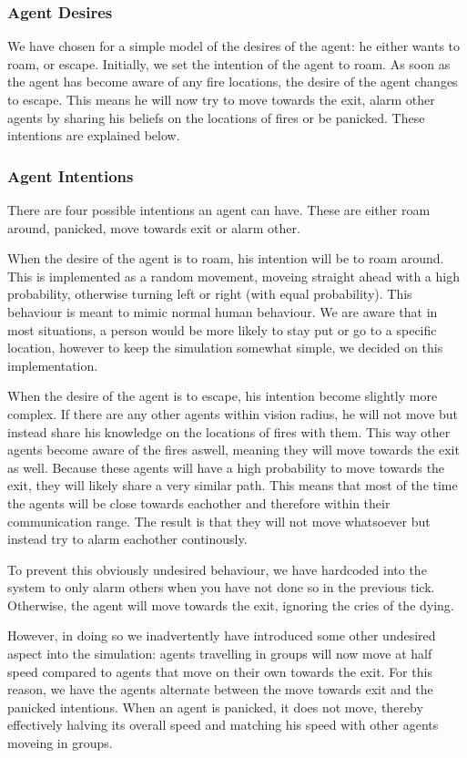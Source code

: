\documentclass[a4paper]{article}
\begin{document}
\subsubsection{Agent Desires}
We have chosen for a simple model of the desires of the agent: he either wants to roam, or escape. Initially, we set the intention of the agent to roam. As soon as the agent has become aware of any fire locations, the desire of the agent changes to escape. This means he will now try to move towards the exit, alarm other agents by sharing his beliefs on the locations of fires or be panicked. These intentions are explained below.

\subsubsection{Agent Intentions}
There are four possible intentions an agent can have. These are either roam around, panicked, move towards exit or alarm other. 

When the desire of the agent is to roam, his intention will be to roam around. This is implemented as a random movement, moveing straight ahead with a high probability, otherwise turning left or right (with equal probability). This behaviour is meant to mimic normal human behaviour. We are aware that in most situations, a person would be more likely to stay put or go to a specific location, however to keep the simulation somewhat simple, we decided on this implementation.

When the desire of the agent is to escape, his intention become slightly more complex. If there are any other agents within vision radius, he will not move but instead share his knowledge on the locations of fires with them. This way other agents become aware of the fires aswell, meaning they will move towards the exit as well. Because these agents will have a high probability to move towards the exit, they will likely share a very similar path. This means that most of the time the agents will be close towards eachother and therefore within their communication range. The result is that they will not move whatsoever but instead try to alarm eachother continously. 

To prevent this obviously undesired behaviour, we have hardcoded into the system to only alarm others when you have not done so in the previous tick. Otherwise, the agent will move towards the exit, ignoring the cries of the dying.

However, in doing so we inadvertently have introduced some other undesired aspect into the simulation: agents travelling in groups will now move at half speed compared to agents that move on their own towards the exit. For this reason, we have the agents alternate between the move towards exit and the panicked intentions. When an agent is panicked, it does not move, thereby effectively halving its overall speed and matching his speed with other agents moveing in groups.
\end{document}
